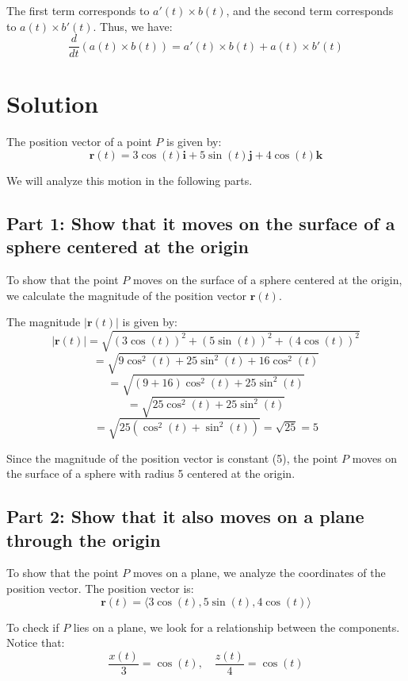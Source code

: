 \documentclass[11pt]{article}
\begin{document}
The first term corresponds to \( a'(t) \times b(t) \), and the second term corresponds to \( a(t) \times b'(t) \). Thus, we have:
\[
\frac{d}{dt} \left( a(t) \times b(t) \right) = a'(t) \times b(t) + a(t) \times b'(t)
\]




\newpage

\section{Solution}

The position vector of a point \( P \) is given by:
\[
\mathbf{r}(t) = 3 \cos(t) \mathbf{i} + 5 \sin(t) \mathbf{j} + 4 \cos(t) \mathbf{k}
\]

We will analyze this motion in the following parts.

\subsection{Part 1: Show that it moves on the surface of a sphere centered at the origin}

To show that the point \( P \) moves on the surface of a sphere centered at the origin, we calculate the magnitude of the position vector \( \mathbf{r}(t) \).

The magnitude \( |\mathbf{r}(t)| \) is given by:
\[
|\mathbf{r}(t)| = \sqrt{(3 \cos(t))^2 + (5 \sin(t))^2 + (4 \cos(t))^2}
\]
\[
= \sqrt{9 \cos^2(t) + 25 \sin^2(t) + 16 \cos^2(t)}
\]
\[
= \sqrt{(9 + 16) \cos^2(t) + 25 \sin^2(t)}
\]
\[
= \sqrt{25 \cos^2(t) + 25 \sin^2(t)}
\]
\[
= \sqrt{25 (\cos^2(t) + \sin^2(t))} = \sqrt{25} = 5
\]

Since the magnitude of the position vector is constant (5), the point \( P \) moves on the surface of a sphere with radius 5 centered at the origin.

\newpage

\subsection{Part 2: Show that it also moves on a plane through the origin}

To show that the point \( P \) moves on a plane, we analyze the coordinates of the position vector. The position vector is:
\[
\mathbf{r}(t) = \langle 3 \cos(t), 5 \sin(t), 4 \cos(t) \rangle
\]

To check if \( P \) lies on a plane, we look for a relationship between the components. Notice that:
\[
\frac{x(t)}{3} = \cos(t), \quad \frac{z(t)}{4} = \cos(t)
\]
\end{document}
